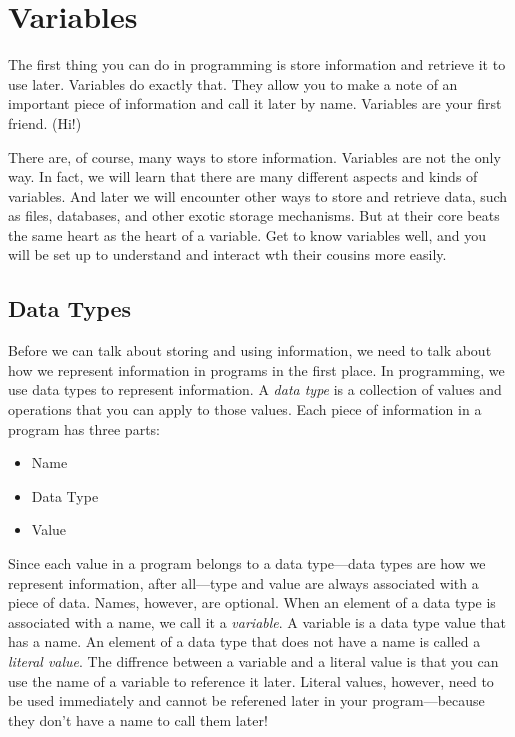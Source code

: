 \chapter[First Friend: Variables]{Variables}
The first thing you can do in programming is store information and retrieve it
to use later. Variables do exactly that. They allow you to make a note of an
important piece of information and call it later by name. Variables are your
first friend. (Hi!)

There are, of course, many ways to store information. Variables are not the only
way. In fact, we will learn that there are many different aspects and kinds of
variables. And later we will encounter other ways to store and retrieve data,
such as files, databases, and other exotic storage mechanisms. But at their core
beats the same heart as the heart of a variable. Get to know variables well, and
you will be set up to understand and interact wth their cousins more easily.

\section{Data Types}
Before we can talk about storing and using information, we need to talk about
how we represent information in programs in the first place. In programming, we
use data types to represent information. A \emph{data type} is a collection of
values and operations that you can
apply to those values. Each piece of information in a program has three parts:

\begin{itemize}
  \item Name
  \item Data Type
  \item Value
\end{itemize}

Since each value in a program belongs to a data type---data types are how we
represent information, after all---type and value are always associated with a
piece of data. Names, however, are optional. When an element of a data type is
associated with a name, we call it a \emph{variable}. A variable is a data type
value that has a name. An element of a data type that does not have a name is
called a \emph{literal value}. The diffrence between a variable and a literal
value is that you can use the name of a variable to reference it later. Literal
values, however, need to be used immediately and cannot be referened later in
your program---because they don't have a name to call them later!

